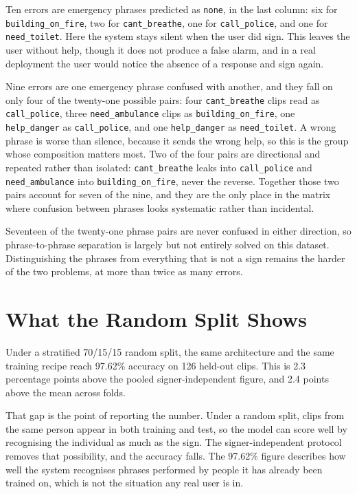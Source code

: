 Ten errors are emergency phrases predicted as \texttt{none}, in the last column: six for \texttt{building\_on\_fire}, two for \texttt{cant\_breathe}, one for \texttt{call\_police}, and one for \texttt{need\_toilet}. Here the system stays silent when the user did sign. This leaves the user without help, though it does not produce a false alarm, and in a real deployment the user would notice the absence of a response and sign again.

Nine errors are one emergency phrase confused with another, and they fall on only four of the twenty-one possible pairs: four \texttt{cant\_breathe} clips read as \texttt{call\_police}, three \texttt{need\_ambulance} clips as \texttt{building\_on\_fire}, one \texttt{help\_danger} as \texttt{call\_police}, and one \texttt{help\_danger} as \texttt{need\_toilet}. A wrong phrase is worse than silence, because it sends the wrong help, so this is the group whose composition matters most. Two of the four pairs are directional and repeated rather than isolated: \texttt{cant\_breathe} leaks into \texttt{call\_police} and \texttt{need\_ambulance} into \texttt{building\_on\_fire}, never the reverse. Together those two pairs account for seven of the nine, and they are the only place in the matrix where confusion between phrases looks systematic rather than incidental.

Seventeen of the twenty-one phrase pairs are never confused in either direction, so phrase-to-phrase separation is largely but not entirely solved on this dataset. Distinguishing the phrases from everything that is not a sign remains the harder of the two problems, at more than twice as many errors.

\section{What the Random Split Shows}
\label{sec:leakage}

Under a stratified 70/15/15 random split, the same architecture and the same training recipe reach 97.62\% accuracy on 126 held-out clips. This is 2.3 percentage points above the pooled signer-independent figure, and 2.4 points above the mean across folds.

That gap is the point of reporting the number. Under a random split, clips from the same person appear in both training and test, so the model can score well by recognising the individual as much as the sign. The signer-independent protocol removes that possibility, and the accuracy falls. The 97.62\% figure describes how well the system recognises phrases performed by people it has already been trained on, which is not the situation any real user is in.

